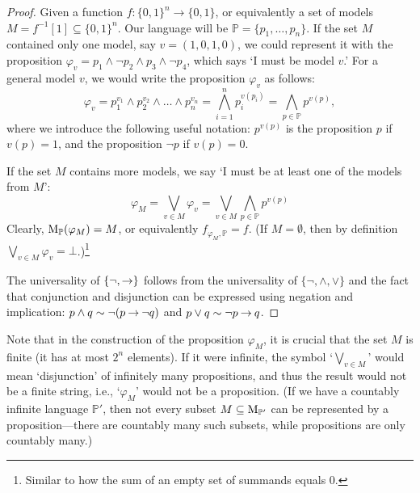 \begin{proof}
Given a function $f\colon \{0,1\}^n\to \{0,1\}$, or equivalently a set of models $M = f^{-1}[1] \subseteq \{0,1\}^n$. Our language will be $\mathbb{P} = \{p_1, \dots, p_n\}$. If the set $M$ contained only one model, say $v = (1,0,1,0)$, we could represent it with the proposition $\varphi_v = p_1 \land \neg p_2 \land p_3 \land \neg p_4$, which says `I must be model $v$.' For a general model $v$, we would write the proposition $\varphi_v$ as follows:
$$
\varphi_v = p_1^{v_1} \land p_2^{v_2} \land \dots \land p_n^{v_n} = \bigwedge_{i=1}^n p_i^{v(p_i)} = \bigwedge_{p \in \mathbb{P}} p^{v(p)},
$$
where we introduce the following useful notation: $p^{v(p)}$ is the proposition $p$ if $v(p) = 1$, and the proposition $\neg p$ if $v(p) = 0$.

If the set $M$ contains more models, we say `I must be at least one of the models from $M$':
$$
\varphi_M = \bigvee_{v \in M} \varphi_v = \bigvee_{v \in M} \bigwedge_{p \in \mathbb{P}} p^{v(p)}
$$
Clearly, $\operatorname{M}_\mathbb{P}(\varphi_M) = M$, or equivalently $f_{\varphi_M,\mathbb{P}} = f$. (If $M = \emptyset$, then by definition $\bigvee_{v \in M} \varphi_v = \bot$.)\footnote{Similar to how the sum of an empty set of summands equals 0.}

The universality of $\{\neg, \mathbin{\rightarrow}\}$ follows from the universality of $\{\neg, \land, \lor\}$ and the fact that conjunction and disjunction can be expressed using negation and implication: $p \land q \sim \neg (p \mathbin{\rightarrow} \neg q)$ and $p \lor q \sim \neg p \mathbin{\rightarrow} q$.
\end{proof}

\begin{remark}
Note that in the construction of the proposition $\varphi_M$, it is crucial that the set $M$ is finite (it has at most $2^n$ elements). If it were infinite, the symbol `$\bigvee_{v \in M}$' would mean `disjunction' of infinitely many propositions, and thus the result would not be a finite string, i.e., `$\varphi_M$' would not be a proposition. (If we have a countably infinite language $\mathbb{P}'$, then not every subset $M \subseteq \operatorname{M}_{\mathbb{P}'}$ can be represented by a proposition---there are countably many such subsets, while propositions are only countably many.)
\end{remark}

